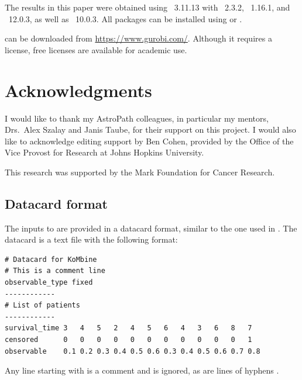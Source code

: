 \documentclass[article]{jss}
\begin{document}
The results in this paper were obtained using ~3.11.13 with ~2.3.2, ~1.16.1, and ~12.0.3, as well as ~10.0.3. All  packages can be installed using  or .

 can be downloaded from \url{https://www.gurobi.com/}. Although it requires a license, free licenses are available for academic use.

\section*{Acknowledgments}

I would like to thank my AstroPath colleagues, in particular my mentors, Drs.~Alex Szalay and Janis Taube, for their support on this project. I would also like to acknowledge editing support by Ben Cohen, provided by the Office of the Vice Provost for Research at Johns Hopkins University.

This research was supported by the Mark Foundation for Cancer Research.






\newpage

\begin{appendix}

\section{Datacard format}\label{app:datacard}

The inputs to  are provided in a datacard format, similar to the one used in  \citep{CAT-23-001}. The datacard is a text file with the following format:
\begin{verbatim}
# Datacard for KoMbine
# This is a comment line
observable_type fixed
------------
# List of patients
------------
survival_time 3   4   5   2   4   5   6   4   3   6   8   7
censored      0   0   0   0   0   0   0   0   0   0   0   1
observable    0.1 0.2 0.3 0.4 0.5 0.6 0.3 0.4 0.5 0.6 0.7 0.8
\end{verbatim}
\end{appendix}
Any line starting with \code{\#} is a comment and is ignored, as are lines of hyphens \code{------------}.
\end{document}
